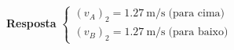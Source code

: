 
\textbf{Resposta}
$
\begin{cases}
	(v_{A})_{2}=\SI{1.27}{\meter/\second}\;\textrm{(para cima)}\\
	(v_{B})_{2}=\SI{1.27}{\meter/\second}\;\textrm{(para baixo)}
\end{cases}
$